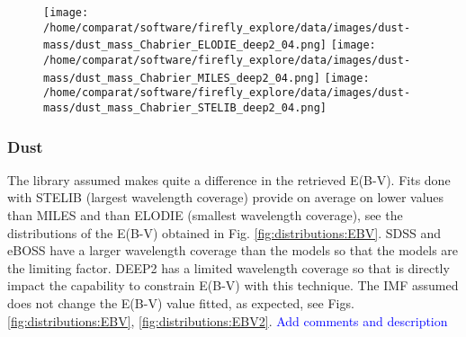 \documentclass[onecolumn]{aa}
\begin{document}
\begin{figure}
\begin{center}
\texttt{[image: /home/comparat/software/firefly\_explore/data/images/dust-mass/dust\_mass\_Chabrier\_ELODIE\_deep2\_04.png]}
\hspace*{-1.7cm}
\texttt{[image: /home/comparat/software/firefly\_explore/data/images/dust-mass/dust\_mass\_Chabrier\_MILES\_deep2\_04.png]}
\hspace*{-1.7cm}
\texttt{[image: /home/comparat/software/firefly\_explore/data/images/dust-mass/dust\_mass\_Chabrier\_STELIB\_deep2\_04.png]}
\end{center}
\end{figure}

\subsubsection{Dust}
\label{subsec:res:dust}
The library assumed makes quite a difference in the retrieved E(B-V). 
Fits done with STELIB (largest wavelength coverage) provide on average on lower values than MILES and than ELODIE (smallest wavelength coverage), see the distributions of the E(B-V) obtained in Fig. \ref{fig:distributions:EBV}. 
SDSS and eBOSS have a larger wavelength coverage than the models so that the models are the limiting factor. 
DEEP2 has a limited wavelength coverage so that is directly impact the capability to constrain E(B-V) with this technique.
The IMF assumed does not change the E(B-V) value fitted, as expected, see Figs. \ref{fig:distributions:EBV}, \ref{fig:distributions:EBV2}. 
\textcolor{blue}{Add comments and description}
\end{document}
